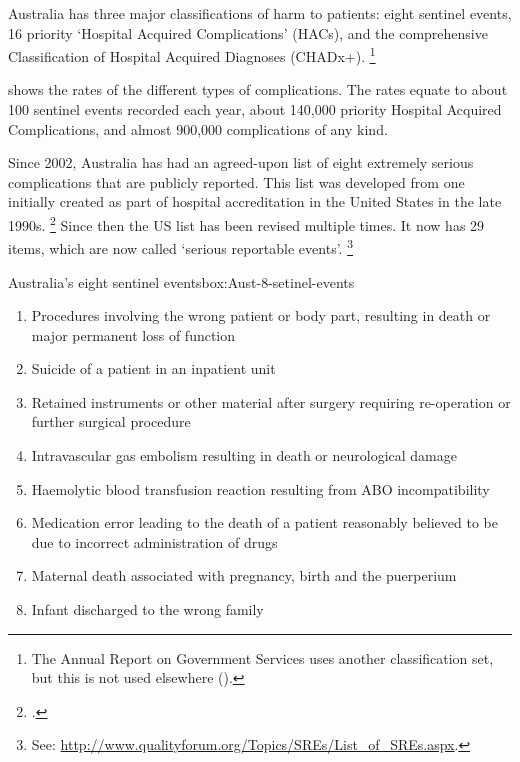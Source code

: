 \documentclass[FrontPage]{grattan}
\begin{document}
Australia has three major classifications of harm to patients:
eight sentinel events, 16 priority `Hospital Acquired Complications' (HACs), and the comprehensive Classification of Hospital Acquired Diagnoses (CHADx+).%
	\footnote{The Annual Report on Government Services uses another classification set, but this is not used elsewhere (\textcite{PC-2017-Report-on-Govt-services--Public-hospitals}).}



 shows the rates of the different types of complications. The rates equate to about 100 sentinel events recorded each year, about 140,000 priority Hospital Acquired Complications, and almost 900,000 complications of any kind.

Since 2002, Australia has had an agreed-upon list of eight extremely serious complications that are publicly reported.
This list was developed from one initially created as part of hospital accreditation in the United States in the late 1990s.%
	\footcites{Kizer-Stegun-2005}{Leape_2002}{Berman_1998}
Since then the US list has been revised multiple times.
It now has 29 items, which are now called `serious reportable events'.%
	\footnote{See: \textcolor{blue}{\url{http://www.qualityforum.org/Topics/SREs/List_of_SREs.aspx}}.}

\begin{smallbox}{Australia's eight sentinel events}{box:Aust-8-setinel-events}
\begin{enumerate}
\item Procedures involving the wrong patient or body part, resulting in death or major permanent loss of function
\item Suicide of a patient in an inpatient unit
\item Retained instruments or other material after surgery requiring re-operation or further surgical procedure
\item Intravascular gas embolism resulting in death or neurological damage
\item Haemolytic blood transfusion reaction resulting from ABO incompatibility
\item Medication error leading to the death of a patient reasonably believed to be due to incorrect administration of drugs
\item Maternal death associated with pregnancy, birth and the puerperium
\item Infant discharged to the wrong family
\end{enumerate}
\end{smallbox}
\end{document}
